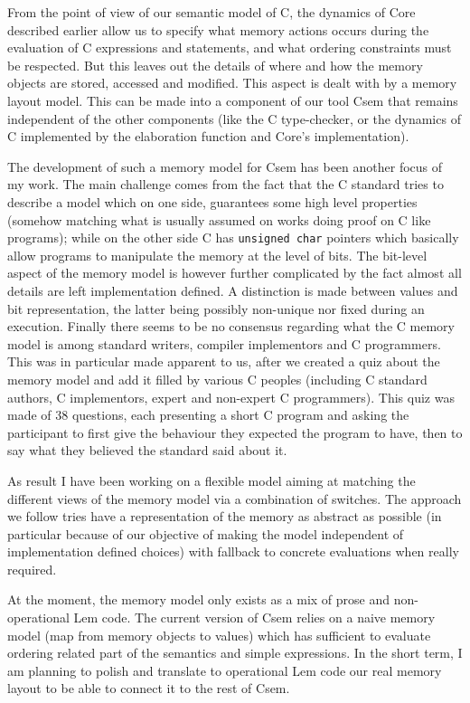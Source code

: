 \documentclass[11pt,a4paper, twocolumn]{article}
\begin{document}
From the point of view of our semantic model of C, the dynamics of
Core described earlier allow us to specify what memory actions occurs
during the evaluation of C expressions and statements, and what
ordering constraints must be respected. But this leaves out the
details of where and how the memory objects are stored, accessed and
modified. This aspect is dealt with by a memory layout model. This can
be made into a component of our tool Csem that remains independent of
the other components (like the C type-checker, or the dynamics of C
implemented by the elaboration function and Core's implementation).

The development of such a memory model for Csem has been another focus
of my work. The main challenge comes from the fact that the C standard
tries to describe a model which on one side, guarantees some high
level properties (somehow matching what is usually assumed on works
doing proof on C like programs); while on the other side C has
\texttt{unsigned char} pointers which basically allow programs to
manipulate the memory at the level of bits. The bit-level aspect of
the memory model is however further complicated by the fact almost all
details are left implementation defined. A distinction is made between
values and bit representation, the latter being possibly non-unique
nor fixed during an execution. Finally there seems to be no consensus
regarding what the C memory model is among standard writers, compiler
implementors and C programmers. This was in particular made apparent
to us, after we created a quiz about the memory model and add it
filled by various C peoples (including C standard authors, C
implementors, expert and non-expert C programmers). This quiz was
made of 38 questions, each presenting a short C program and asking the
participant to first give the behaviour they expected the program to
have, then to say what they believed the standard said about it.

As result I have been working on a flexible model aiming at matching
the different views of the memory model via a combination of
switches. The approach we follow tries have a representation of the
memory as abstract as possible (in particular because of our objective
of making the model independent of implementation defined choices)
with fallback to concrete evaluations when really required.

At the moment, the memory model only exists as a mix of prose and
non-operational Lem code. The current version of Csem relies on a
naive memory model (map from memory objects to values) which has
sufficient to evaluate ordering related part of the semantics and
simple expressions. In the short term, I am planning to polish and
translate to operational Lem code our real memory layout to be able to
connect it to the rest of Csem.
\end{document}
